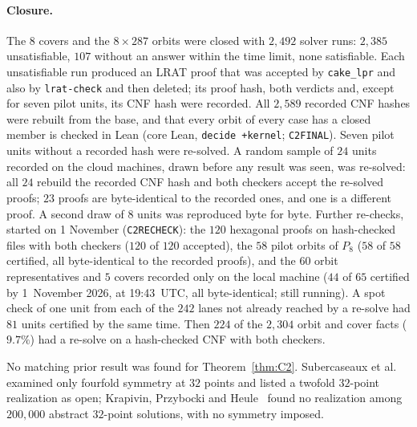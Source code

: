 \documentclass[11pt]{article}
\theoremstyle{remark}
\begin{document}
\paragraph{Closure.} The $8$ covers and the $8\times287$ orbits were closed with $2{,}492$ solver runs: $2{,}385$
unsatisfiable, $107$ without an answer within the time limit, none satisfiable. Each unsatisfiable run produced an LRAT
proof that was accepted by \texttt{cake\_lpr} and also by \texttt{lrat-check} and then deleted; its proof hash, both verdicts and,
except for seven pilot units, its CNF hash were recorded. All $2{,}589$ recorded CNF hashes were rebuilt from the base,
and that every orbit of every case has a closed member is checked in Lean (core Lean, \texttt{decide +kernel};
\texttt{C2FINAL}). Seven pilot units without a recorded hash were re-solved. A random sample of $24$ units recorded on the
cloud machines, drawn before any result was seen, was re-solved: all $24$ rebuild the recorded CNF hash and both checkers
accept the re-solved proofs; $23$ proofs are byte-identical to the recorded ones, and one is a different proof. A second
draw of $8$ units was reproduced byte for byte. Further re-checks, started on 1 November
(\texttt{C2RECHECK}): the $120$ hexagonal proofs on hash-checked files with both checkers ($120$ of $120$ accepted), the
$58$ pilot orbits of $P_8$ ($58$ of $58$ certified, all byte-identical to the recorded proofs), and the $60$ orbit
representatives and $5$ covers recorded only on the local machine ($44$ of $65$ certified by 1~November 2026, at
19:43~UTC, all byte-identical; still running). A spot check of one unit from each of the $242$ lanes not already reached by a re-solve had
$81$ units certified by the same time. Then $224$ of the $2{,}304$ orbit and cover facts ($9.7\%$) had a re-solve on a hash-checked CNF with
both checkers.

No matching prior result was found for Theorem~\ref{thm:C2}. Subercaseaux et al.~\cite{SMQH25} examined only fourfold
symmetry at $32$ points and listed a twofold $32$-point realization as open; Krapivin, Przybocki and Heule~\cite{KPH26}
found no realization among $200{,}000$ abstract $32$-point solutions, with no symmetry imposed.
\end{document}
